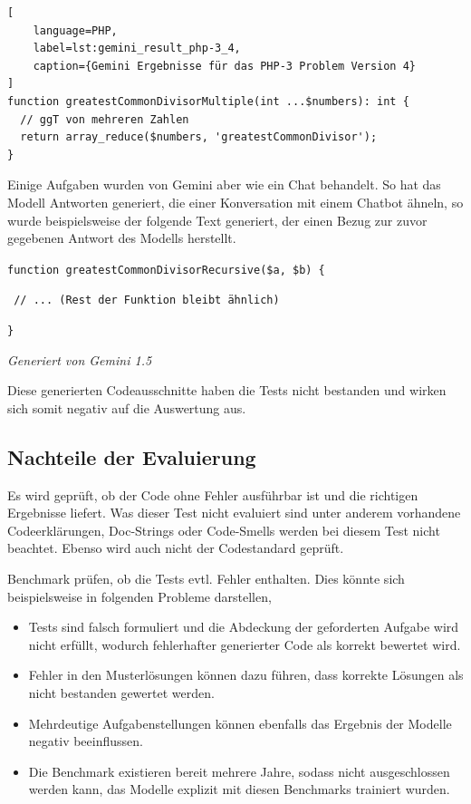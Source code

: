 \begin{lstlisting}[
	language=PHP,
	label=lst:gemini_result_php-3_4,
	caption={Gemini Ergebnisse für das PHP-3 Problem Version 4}
]
function greatestCommonDivisorMultiple(int ...$numbers): int {
  // ggT von mehreren Zahlen
  return array_reduce($numbers, 'greatestCommonDivisor');
}
\end{lstlisting}

Einige Aufgaben wurden von Gemini aber wie ein Chat behandelt. So hat das Modell Antworten generiert, die einer Konversation mit einem Chatbot ähneln, so wurde beispielsweise der folgende Text generiert, der einen Bezug zur zuvor gegebenen Antwort des Modells herstellt.

\hrulefill

\texttt{function greatestCommonDivisorRecursive(\$a, \$b) \{}

\texttt{\hspace{0.6cm} // ... (Rest der Funktion bleibt ähnlich)}

\texttt{\}}

\hrulefill

\begin{flushright}
	\textit{Generiert von Gemini 1.5}
\end{flushright}

Diese generierten Codeausschnitte haben die Tests nicht bestanden und wirken sich somit negativ auf die Auswertung aus.

\subsection{Nachteile der Evaluierung}
Es wird geprüft, ob der Code ohne Fehler ausführbar ist und die richtigen Ergebnisse liefert. Was dieser Test nicht evaluiert sind unter anderem vorhandene Codeerklärungen, Doc-Strings oder Code-Smells werden bei diesem Test nicht beachtet. Ebenso wird auch nicht der Codestandard geprüft.\vspace{0.2cm}

Benchmark prüfen, ob die Tests evtl. Fehler enthalten. Dies könnte sich beispielsweise in folgenden Probleme darstellen,

\begin{itemize}
	\item Tests sind falsch formuliert und die Abdeckung der geforderten Aufgabe wird nicht erfüllt, wodurch fehlerhafter generierter Code als korrekt bewertet wird.
	\item Fehler in den Musterlösungen können dazu führen, dass korrekte Lösungen als nicht bestanden gewertet werden.
	\item Mehrdeutige Aufgabenstellungen können ebenfalls das Ergebnis der Modelle negativ beeinflussen.
	\item Die Benchmark existieren bereit mehrere Jahre, sodass nicht ausgeschlossen werden kann, das Modelle explizit mit diesen Benchmarks trainiert wurden.
\end{itemize}

